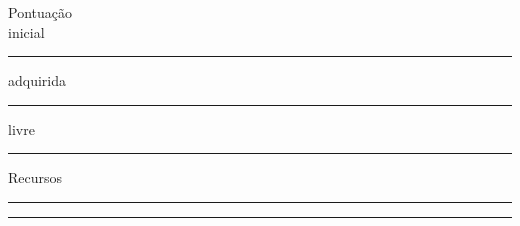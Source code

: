 \documentclass[a4paper,12pt]{article}
\begin{document}
	\begin{minipage}{\linewidth}
		\begin{minipage}{.7\linewidth}
			Pontuação\\
			inicial \rule{.1\linewidth}{.5pt} 
			adquirida \rule{.3\linewidth}{.5pt} 
			livre \rule{.2\linewidth}{.5pt}
		\end{minipage}
		\begin{minipage}{.2\linewidth}
			{\centering Recursos\\}
			\rule{\linewidth}{.5pt}
			\rule{\linewidth}{.5pt}
		\end{minipage}
	\end{minipage}
	
\end{document}
